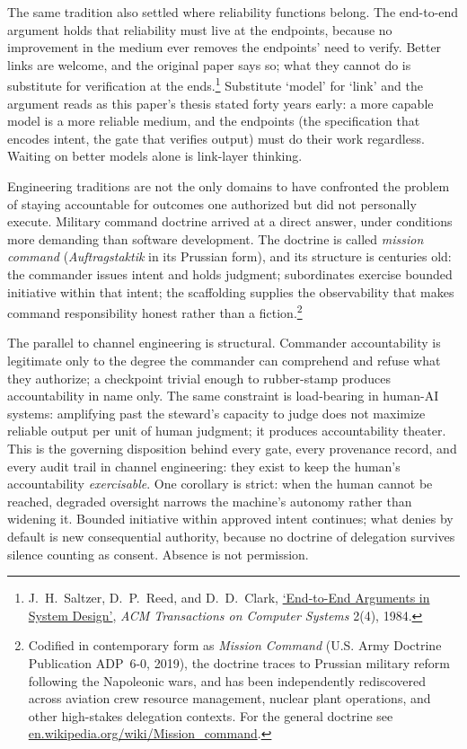 \documentclass[11pt, a4paper]{article}
\begin{document}
The same tradition also settled where reliability functions belong. The end-to-end
argument holds that reliability must live at the endpoints, because no improvement in
the medium ever removes the endpoints' need to verify. Better links are welcome, and the
original paper says so; what they cannot do is substitute for verification at the
ends.\footnote{J.~H.~Saltzer, D.~P.~Reed, and
D.~D.~Clark, \href{https://web.mit.edu/Saltzer/www/publications/endtoend/endtoend.pdf}{`End-to-End
Arguments in System Design'}, \textit{ACM Transactions on Computer Systems} 2(4), 1984.}
Substitute `model' for `link' and the argument reads as this paper's thesis stated forty
years early: a more capable model is a more reliable medium, and the endpoints (the
specification that encodes intent, the gate that verifies output) must do their work
regardless. Waiting on better models alone is link-layer thinking.

Engineering traditions are not the only domains to have confronted the problem
of staying accountable for outcomes one authorized but did not personally execute.
Military command doctrine arrived at a direct answer, under conditions more demanding
than software development. The doctrine is called \emph{mission command} (\textit{Auftragstaktik}
in its Prussian form), and its structure is centuries old: the commander issues intent and
holds judgment; subordinates exercise bounded initiative within that intent; the
scaffolding supplies the observability that makes command responsibility honest rather
than a fiction.\footnote{Codified in contemporary form as \textit{Mission Command}
(U.S. Army Doctrine Publication ADP~6-0, 2019), the doctrine traces to Prussian military
reform following the Napoleonic wars, and has been independently rediscovered across
aviation crew resource management, nuclear plant operations, and other high-stakes
delegation contexts. For the general doctrine see
\href{https://en.wikipedia.org/wiki/Mission_command}{en.wikipedia.org/wiki/Mission\_command}.}

The parallel to channel engineering is structural. Commander accountability is
legitimate only to the degree the commander can comprehend and refuse what they authorize;
a checkpoint trivial enough to rubber-stamp produces accountability in name only. The
same constraint is load-bearing in human-AI systems: amplifying past the steward's
capacity to judge does not maximize reliable output per unit of human judgment; it
produces accountability theater. This is the governing disposition behind every gate,
every provenance record, and every audit trail in channel engineering: they exist to
keep the human's accountability \emph{exercisable}. One corollary is strict: when the
human cannot be reached, degraded oversight narrows the machine's autonomy rather than
widening it. Bounded initiative within approved intent continues; what denies by default
is new consequential authority, because no doctrine of delegation survives silence
counting as consent. Absence is not permission.
\end{document}
